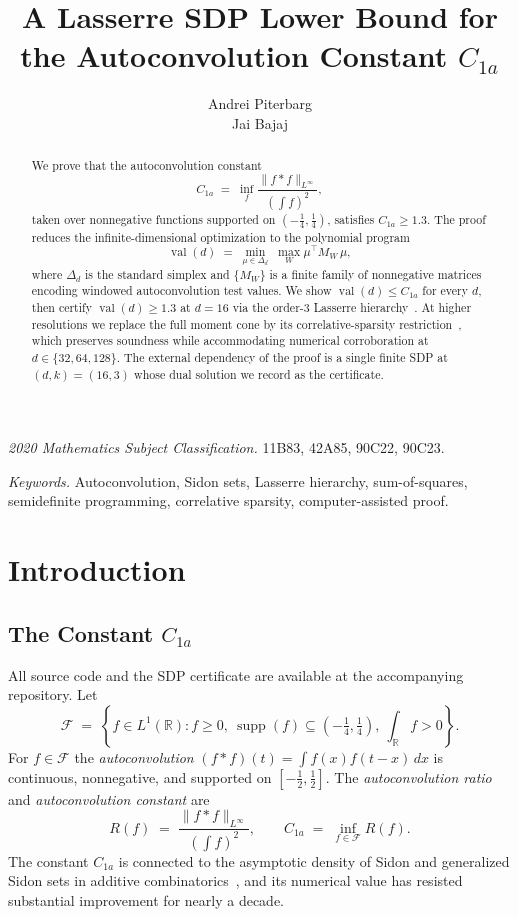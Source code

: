 \documentclass[11pt, letterpaper]{article}
\title{\texorpdfstring{%
  \bfseries A Lasserre SDP Lower Bound for the Autoconvolution Constant $C_{1a}$
}{A Lasserre SDP Lower Bound for the Autoconvolution Constant C1a}}
\author{Andrei Piterbarg \\ Jai Bajaj}
\date{}
\theoremstyle{paperplain}
\theoremstyle{paperdef}
\newcommand{\R}{\mathbb{R}}
\newcommand{\supp}{\operatorname{supp}}
\newcommand{\val}{\operatorname{val}}
\begin{document}
\maketitle

\begin{abstract}
We prove that the autoconvolution constant
\[
  C_{1a}
  \;=\;
  \inf_f \frac{\|f*f\|_{L^\infty}}{\left(\int f\right)^2},
\]
taken over nonnegative functions supported on $(-\tfrac14,\tfrac14)$,
satisfies $C_{1a}\ge 1.3$.  The proof reduces the infinite-dimensional
optimization to the polynomial program
\[
  \val(d)
  \;=\;
  \min_{\mu \in \Delta_d}\;\max_W \mu^\top M_W\,\mu,
\]
where $\Delta_d$ is the standard simplex and $\{M_W\}$ is a finite
family of nonnegative matrices encoding windowed autoconvolution test
values.  We show $\val(d) \le C_{1a}$ for every $d$, then certify
$\val(d)\ge 1.3$ at $d=16$ via the order-$3$ Lasserre
hierarchy~\cite{Lasserre2001}.  At higher resolutions we replace
the full moment cone by its correlative-sparsity
restriction~\cite{Waki2006}, which preserves soundness while
accommodating numerical corroboration at $d\in\{32,64,128\}$.  The
external dependency of the proof is a single finite SDP at
$(d,k)=(16,3)$ whose dual solution we record as the certificate.
\end{abstract}
\noindent\textit{2020 Mathematics Subject Classification.}
11B83, 42A85, 90C22, 90C23.

\smallskip

\noindent\textit{Keywords.}
Autoconvolution, Sidon sets, Lasserre hierarchy, sum-of-squares,
semidefinite programming, correlative sparsity, computer-assisted
proof.

\medskip

\section{Introduction}\label{sec:intro}

\subsection{The Constant \texorpdfstring{$C_{1a}$}{C1a}}

All source code and the SDP certificate are available at the
accompanying repository.  Let
\[
  \mathcal{F}
  \;=\;
  \left\{
    f \in L^1(\R) :
    f \ge 0,\
    \supp(f) \subseteq \left(-\tfrac14,\tfrac14\right),\
    \int_{\R} f > 0
  \right\}.
\]
For $f\in\mathcal{F}$ the \emph{autoconvolution} $(f*f)(t) =
\int f(x)f(t-x)\,dx$ is continuous, nonnegative, and supported on
$[-\tfrac12,\tfrac12]$.  The \emph{autoconvolution ratio} and
\emph{autoconvolution constant} are
\[
  R(f) \;=\; \frac{\|f*f\|_{L^\infty}}{\left(\int f\right)^2},
  \qquad
  C_{1a} \;=\; \inf_{f \in \mathcal{F}} R(f).
\]
The constant $C_{1a}$ is connected to the asymptotic density of Sidon
and generalized Sidon sets in additive
combinatorics~\cite{ET41,MO2006,CRV10,MO2009,CS17}, and its numerical
value has resisted substantial improvement for nearly a decade.
\end{document}
